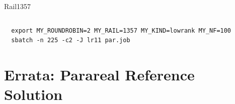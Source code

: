 \begin{frame}[b,fragile,label=other]{Rail1357}
\begin{columns}[T]
\begin{itemize}
  \end{itemize}
  \end{columns}
  \vfill
  \begin{lstlisting}
  export MY_ROUNDROBIN=2 MY_RAIL=1357 MY_KIND=lowrank MY_NF=100
  sbatch -n 225 -c2 -J lr11 par.job
  \end{lstlisting}
\end{frame}

\section{Errata: Parareal Reference Solution}

